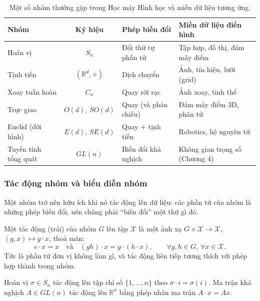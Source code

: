 \begin{table}[t]
\centering
\caption{Một số nhóm thường gặp trong Học máy Hình học và miền dữ liệu tương ứng.}
\label{tab:cac-nhom}
\renewcommand{\arraystretch}{1.25}
\begin{tabularx}{\linewidth}{@{}l c L L@{}}
\toprule
\textbf{Nhóm} & \textbf{Ký hiệu} & \textbf{Phép biến đổi} & \textbf{Miền dữ liệu điển hình}\\
\midrule
Hoán vị        & $S_{n}$       & Đổi thứ tự phần tử      & Tập hợp, đồ thị, đám mây điểm \\
Tịnh tiến      & $(\mathbb{R}^{d},+)$ & Dịch chuyển       & Ảnh, tín hiệu, lưới (grid) \\
Xoay tuần hoàn & $C_{n}$       & Quay rời rạc            & Ảnh xoay, tinh thể \\
Trực giao      & $O(d),\,SO(d)$& Quay (và phản chiếu)    & Đám mây điểm 3D, phân tử \\
Euclid (dời hình) & $E(d),\,SE(d)$ & Quay $+$ tịnh tiến  & Robotics, hệ nguyên tử \\
Tuyến tính tổng quát & $GL(n)$  & Biến đổi khả nghịch     & Không gian trọng số (Chương 4) \\
\bottomrule
\end{tabularx}
\end{table}
 
\subsubsection{Tác động nhóm và biểu diễn nhóm}
\label{ssub:group-action}
 
Một nhóm trở nên hữu ích khi nó tác động lên dữ liệu: các phần tử của nhóm
là những phép biến đổi, nên chúng phải ``biến đổi'' một thứ gì đó.
 
\begin{definition}
\label{def:tac-dong}
Một tác động (trái) của nhóm $G$ lên tập $\mathcal{X}$ là một ánh xạ
$G\times\mathcal{X}\to\mathcal{X}$, $(g,x)\mapsto g\cdot x$, thoả mãn:
\begin{equation}
e\cdot x = x \quad\text{và}\quad (gh)\cdot x = g\cdot(h\cdot x),
\qquad \forall g,h\in G,\ \forall x\in\mathcal{X}.
\end{equation}
Tức là phần tử đơn vị không làm gì, và tác động liên tiếp tương thích với phép
hợp thành trong nhóm.
\end{definition}
 
\begin{example}
\label{vd:action}
Hoán vị $\sigma\in S_{n}$ tác động lên tập chỉ số $\{1,\dots,n\}$ theo
$\sigma\cdot i = \sigma(i)$. Ma trận khả nghịch $A\in GL(n)$ tác động lên
$\mathbb{R}^{n}$ bằng phép nhân ma trận $A\cdot x = Ax$.
\end{example}
 
